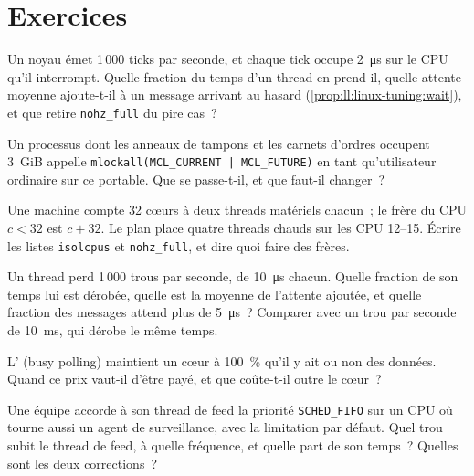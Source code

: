 \section{Exercices}

\begin{exercise}[$\star$]\label{exo:ll:linux-tuning:1}
Un noyau émet 1\,000 ticks par seconde, et chaque tick occupe \qty{2}{\micro\second} sur le CPU qu'il interrompt. Quelle fraction
du temps d'un thread en  prend-il, quelle attente moyenne ajoute-t-il à un message arrivant au hasard
(\cref{prop:ll:linux-tuning:wait}), et que retire \texttt{nohz\_full} du pire cas~?
\end{exercise}

\begin{exercise}[$\star$]\label{exo:ll:linux-tuning:2}
Un processus dont les anneaux de tampons et les carnets d'ordres occupent 3~GiB appelle \texttt{mlockall(MCL\_CURRENT | MCL\_FUTURE)} en tant qu'utilisateur ordinaire sur ce
portable. Que se passe-t-il, et que faut-il changer~?
\end{exercise}

\begin{exercise}[$\star$]\label{exo:ll:linux-tuning:3}
Une machine compte 32 cœurs à deux threads matériels chacun~; le frère du CPU $c < 32$ est $c + 32$. Le plan place quatre threads chauds sur
les CPU 12--15. Écrire les listes \texttt{isolcpus} et \texttt{nohz\_full}, et dire quoi faire des frères.
\end{exercise}

\begin{exercise}[$\star\star$]\label{exo:ll:linux-tuning:4}
Un thread perd 1\,000 trous par seconde, de \qty{10}{\micro\second} chacun. Quelle fraction de son temps lui est dérobée, quelle est la
moyenne de l'attente ajoutée, et quelle fraction des messages attend plus de \qty{5}{\micro\second}~? Comparer avec un trou par seconde de
\qty{10}{\milli\second}, qui dérobe le même temps.
\end{exercise}

\begin{exercise}[$\star\star$]\label{exo:ll:linux-tuning:5}
L' (busy polling) maintient un cœur à 100~\% qu'il y ait ou non des données. Quand ce prix vaut-il d'être payé, et que coûte-t-il
outre le cœur~?
\end{exercise}

\begin{exercise}[$\star\star$]\label{exo:ll:linux-tuning:6}
Une équipe accorde à son thread de feed la priorité \texttt{SCHED\_FIFO} sur un CPU où tourne aussi un agent de surveillance, avec la
limitation par défaut. Quel trou subit le thread de feed, à quelle fréquence, et quelle part de son temps~? Quelles sont les deux corrections~?
\end{exercise}

